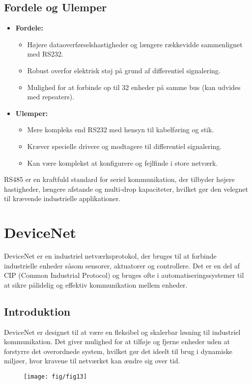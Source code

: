 \subsection{Fordele og Ulemper}
\begin{itemize}
	\item \textbf{Fordele:}
	\begin{itemize}
		\item Højere dataoverførselshastigheder og længere rækkevidde sammenlignet med RS232.
		\item Robust overfor elektrisk støj på grund af differentiel signalering.
		\item Mulighed for at forbinde op til 32 enheder på samme bus (kan udvides med repeaters).
	\end{itemize}
	\item \textbf{Ulemper:}
	\begin{itemize}
		\item Mere kompleks end RS232 med hensyn til kabelføring og stik.
		\item Kræver specielle drivere og modtagere til differentiel signalering.
		\item Kan være komplekst at konfigurere og fejlfinde i store netværk.
	\end{itemize}
\end{itemize}
RS485 er en kraftfuld standard for seriel kommunikation, der tilbyder højere hastigheder, længere afstande og multi-drop kapaciteter, hvilket gør den velegnet til krævende industrielle applikationer.

\section{DeviceNet}
DeviceNet er en industriel netværksprotokol, der bruges til at forbinde industrielle enheder såsom sensorer, aktuatorer og controllere. Det er en del af CIP (Common Industrial Protocol) og bruges ofte i automatiseringssystemer til at sikre pålidelig og effektiv kommunikation mellem enheder.

\subsection{Introduktion}
DeviceNet er designet til at være en fleksibel og skalerbar løsning til industriel kommunikation. Det giver mulighed for at tilføje og fjerne enheder uden at forstyrre det overordnede system, hvilket gør det ideelt til brug i dynamiske miljøer, hvor kravene til netværket kan ændre sig over tid.
\begin{figure}[!h]
	\centering
	\texttt{[image: fig/fig13]}
\end{figure}

